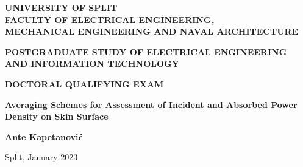 \protect\thispagestyle{empty}
\begin{titlepage}
\begin{center}

\normalsize
\textbf{UNIVERSITY OF SPLIT\\
FACULTY OF ELECTRICAL ENGINEERING,\\MECHANICAL ENGINEERING AND NAVAL ARCHITECTURE}

\vspace{1cm}

\textbf{POSTGRADUATE STUDY OF ELECTRICAL ENGINEERING AND INFORMATION TECHNOLOGY}

\vfill

\textbf{DOCTORAL QUALIFYING EXAM}

\vspace{2cm}

\Large
\textbf{Averaging Schemes for Assessment of Incident and Absorbed Power Density on Skin Surface}

\vspace{2cm}

\normalsize 
\textbf{Ante Kapetanović}

\vfill

\normalsize
Split, January 2023

\end{center}
\end{titlepage}